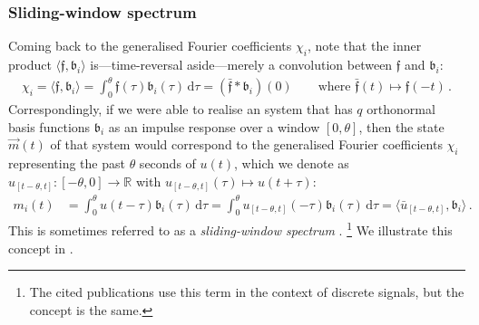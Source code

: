 \subsubsection{Sliding-window spectrum}
Coming back to the generalised Fourier coefficients $\chi_i$, note that the inner product $\langle \mathfrak{f}, \mathfrak{b}_i \rangle$ is---time-reversal aside---merely a convolution between $\mathfrak{f}$ and $\mathfrak{b}_i$:
\begin{align*}
	\chi_i = \langle \mathfrak{f}, \mathfrak{b}_i \rangle = \int_0^\theta \!\! \mathfrak{f}(\tau) \mathfrak{b}_i(\tau) \, \mathrm{d}\tau = (\bar{\mathfrak{f}} \ast \mathfrak{b}_i)(0) \quad \quad \text{where } \bar{\mathfrak{f}}(t) \mapsto \mathfrak{f}(-t) \,.
\end{align*}
Correspondingly, if we were able to realise an \LTI system that has $q$ orthonormal basis functions $\mathfrak{b}_i$ as an impulse response over a window $[0, \theta]$, then the state $\vec m(t)$ of that system would correspond to the generalised Fourier coefficients $\chi_i$ representing the past $\theta$ seconds of $u(t)$, which we denote as $u_{[t - \theta, t]} : [-\theta, 0] \longrightarrow \mathbb{R}$ with $u_{[t - \theta, t]}(\tau) \mapsto u(t + \tau)$:
\begin{align*}
	m_i(t) &= \int_0^\theta \!\! u(t - \tau) \mathfrak{b}_i(\tau) \, \mathrm{d}\tau
	        = \int_0^\theta \!\! u_{[t - \theta, t]}(-\tau) \mathfrak{b}_i(\tau) \, \mathrm{d}\tau
	        = \langle \bar u_{[t - \theta, t]}, \mathfrak{b}_i \rangle  \,.
\end{align*}
This is sometimes referred to as a \emph{sliding-window spectrum} \citep{bastiaans1985slidingwindow,denbrinler1996generalized}.%
\footnote{The cited publications use this term in the context of discrete signals, but the concept is the same.}
We illustrate this concept in .

